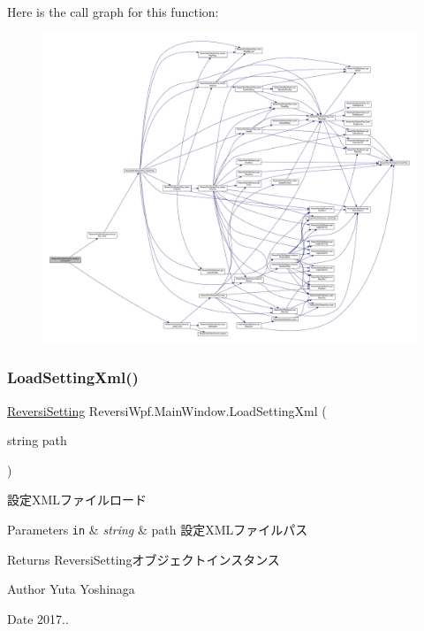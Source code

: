 Here is the call graph for this function\+:
\nopagebreak
\begin{figure}[H]
\begin{center}
\leavevmode
\includegraphics[width=350pt]{class_reversi_wpf_1_1_main_window_a4cf9bc92cee02fa8e3b00fa56fb41c82_cgraph}
\end{center}
\end{figure}
\mbox{\label{class_reversi_wpf_1_1_main_window_ad911eb50aa81ec46e9f1032f264ee483}} 
\subsubsection{\texorpdfstring{Load\+Setting\+Xml()}{LoadSettingXml()}}
{\footnotesize\ttfamily \hyperlink{class_reversi_wpf_1_1_reversi_setting}{Reversi\+Setting} Reversi\+Wpf.\+Main\+Window.\+Load\+Setting\+Xml (\begin{DoxyParamCaption}\item[{string}]{path }\end{DoxyParamCaption})}



設定\+X\+M\+Lファイルロード 


\begin{DoxyParams}[1]{Parameters}
\mbox{\tt in}  & {\em string} & path 設定\+X\+M\+Lファイルパス \\
\hline
\end{DoxyParams}
\begin{DoxyReturn}{Returns}
Reversi\+Settingオブジェクトインスタンス 
\end{DoxyReturn}
\begin{DoxyAuthor}{Author}
Yuta Yoshinaga 
\end{DoxyAuthor}
\begin{DoxyDate}{Date}
2017.. 
\end{DoxyDate}


